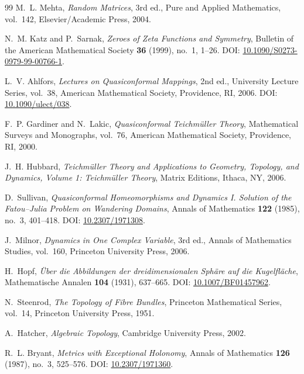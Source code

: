 \documentclass[12pt,a4paper]{article}
\begin{document}
\begin{thebibliography}{99}
M.~L. Mehta,
\emph{Random Matrices},
3rd ed., Pure and Applied Mathematics, vol.~142,
Elsevier/Academic Press, 2004.

N.~M. Katz and P.~Sarnak,
\emph{Zeroes of Zeta Functions and Symmetry},
Bulletin of the American Mathematical Society \textbf{36} (1999), no.~1, 1--26.
\newblock DOI: \href{https://doi.org/10.1090/S0273-0979-99-00766-1}{10.1090/S0273-0979-99-00766-1}.

L.~V. Ahlfors,
\emph{Lectures on Quasiconformal Mappings},
2nd ed., University Lecture Series, vol.~38,
American Mathematical Society, Providence, RI, 2006.
\newblock DOI: \href{https://doi.org/10.1090/ulect/038}{10.1090/ulect/038}.

F.~P. Gardiner and N.~Lakic,
\emph{Quasiconformal Teichm\"uller Theory},
Mathematical Surveys and Monographs, vol.~76,
American Mathematical Society, Providence, RI, 2000.

J.~H. Hubbard,
\emph{Teichm\"uller Theory and Applications to Geometry, Topology, and Dynamics, Volume 1: Teichm\"uller Theory},
Matrix Editions, Ithaca, NY, 2006.

D.~Sullivan,
\emph{Quasiconformal Homeomorphisms and Dynamics I. Solution of the Fatou--Julia Problem on Wandering Domains},
Annals of Mathematics \textbf{122} (1985), no.~3, 401--418.
\newblock DOI: \href{https://doi.org/10.2307/1971308}{10.2307/1971308}.

J.~Milnor,
\emph{Dynamics in One Complex Variable},
3rd ed., Annals of Mathematics Studies, vol.~160,
Princeton University Press, 2006.

H.~Hopf,
\emph{\"Uber die Abbildungen der dreidimensionalen Sph\"are auf die Kugelfl\"ache},
Mathematische Annalen \textbf{104} (1931), 637--665.
\newblock DOI: \href{https://doi.org/10.1007/BF01457962}{10.1007/BF01457962}.

N.~Steenrod,
\emph{The Topology of Fibre Bundles},
Princeton Mathematical Series, vol.~14,
Princeton University Press, 1951.

A.~Hatcher,
\emph{Algebraic Topology},
Cambridge University Press, 2002.

R.~L. Bryant,
\emph{Metrics with Exceptional Holonomy},
Annals of Mathematics \textbf{126} (1987), no.~3, 525--576.
\newblock DOI: \href{https://doi.org/10.2307/1971360}{10.2307/1971360}.


\end{thebibliography}
\end{document}
